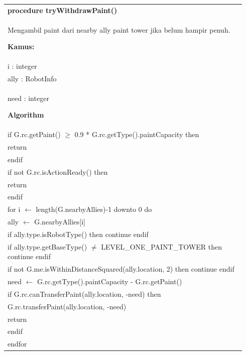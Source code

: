 \documentclass{article}
\newenvironment{pseudobox}
{
\centering
\begin{longtable}{|p{0.94\linewidth}|}
\hline
}
{
\\ \hline
\end{longtable}
\vspace{0.05cm}
}
\begin{document}
\begin{pseudobox}
\textbf{procedure tryWithdrawPaint()} \\
{ Mengambil paint dari nearby ally paint tower jika belum hampir penuh. }

\textbf{Kamus:} \\
\hspace*{1em} i : integer \\
\hspace*{1em} ally : RobotInfo \\
\hspace*{1em} need : integer

\textbf{Algorithm} \\
\hspace*{1em} if G.rc.getPaint() $\geq$ 0.9 * G.rc.getType().paintCapacity then \\
\hspace*{2em} return \\
\hspace*{1em} endif \\

\hspace*{1em} if not G.rc.isActionReady() then \\
\hspace*{2em} return \\
\hspace*{1em} endif \\

\hspace*{1em} for i $\leftarrow$ length(G.nearbyAllies)-1 downto 0 do \\
\hspace*{2em} ally $\leftarrow$ G.nearbyAllies[i] \\
\hspace*{2em} if ally.type.isRobotType() then continue endif \\
\hspace*{2em} if ally.type.getBaseType() $\neq$ LEVEL\_ONE\_PAINT\_TOWER then continue endif \\
\hspace*{2em} if not G.me.isWithinDistanceSquared(ally.location, 2) then continue endif \\

\hspace*{2em} need $\leftarrow$ G.rc.getType().paintCapacity - G.rc.getPaint() \\
\hspace*{2em} if G.rc.canTransferPaint(ally.location, -need) then \\
\hspace*{3em} G.rc.transferPaint(ally.location, -need) \\
\hspace*{3em} return \\
\hspace*{2em} endif \\
\hspace*{1em} endfor
\end{pseudobox}
\end{document}
